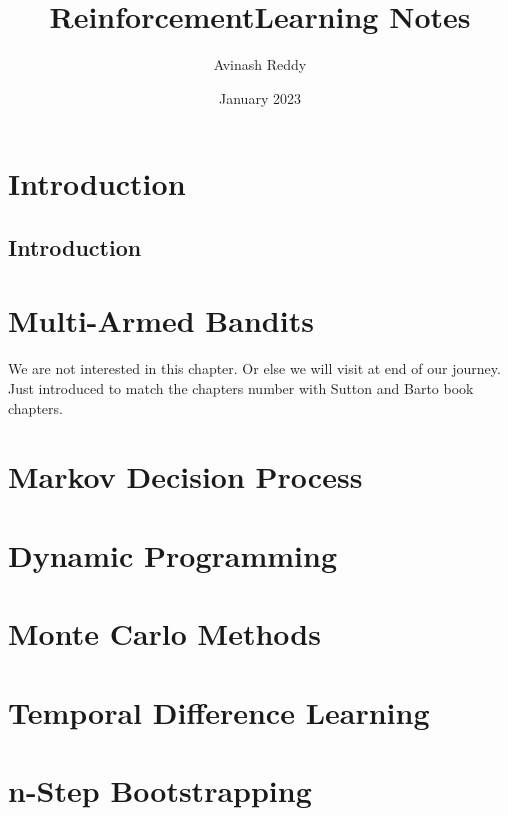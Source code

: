 \documentclass{book}
\title{ReinforcementLearning Notes}
\author{Avinash Reddy}
\date{January 2023}
\begin{document}
\maketitle

\chapter{Introduction}
\section*{Introduction}



\chapter{Multi-Armed Bandits}
We are not interested in this chapter. Or else we will visit at end of our journey. Just introduced to match the chapters number with Sutton and Barto book chapters.

\chapter{Markov Decision Process}


\chapter{Dynamic Programming}


\chapter{Monte Carlo Methods}


\chapter{Temporal Difference Learning}


\chapter{n-Step Bootstrapping}


% 

% 
\end{document}
